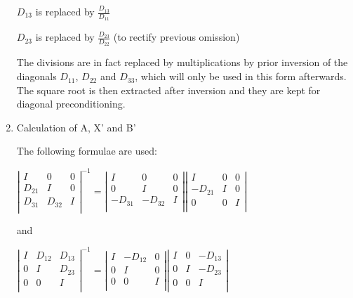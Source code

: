 \begin{enumerate}
$D_{13}$ is replaced by $\frac{D_{13}}{D_{11}}$

$D_{23}$ is replaced by $\frac{D_{23}}{D_{22}}$ (to rectify previous omission)

The divisions are in fact replaced by multiplications by prior inversion of the
diagonals $D_{11}$, $D_{22}$ and $D_{33}$, which will only be used in this form
afterwards.  The square root is then extracted after inversion and they are
kept for diagonal preconditioning.

\item Calculation of A, X' and B'

The following formulae are used:

$
\left|\begin{array}{ccc}
  I & 0 & 0 \\
  D_{21} & I & 0 \\
  D_{31} & D_{32} & I \\
\end{array}\right|
^{-1}
=
\left|\begin{array}{ccc}
  I & 0 & 0 \\
  0 & I & 0 \\
  -D_{31} & -D_{32} & I \\
\end{array}\right|
\left|\begin{array}{ccc}
  I & 0 & 0 \\
  -D_{21} & I & 0 \\
  0 & 0 & I \\
\end{array}\right|
$

and

$
\left|\begin{array}{ccc}
  I & D_{12} & D_{13} \\
  0 & I & D_{23} \\
  0 & 0 & I \\
\end{array}\right|
^{-1}
=
\left|\begin{array}{ccc}
  I & -D_{12} & 0 \\
  0 & I & 0 \\
  0 &  0& I \\
\end{array}\right|
\left|\begin{array}{ccc}
  I & 0 & -D_{13} \\
  0 & I & -D_{23} \\
  0 & 0 & I \\
\end{array}\right|
$


\end{enumerate}
